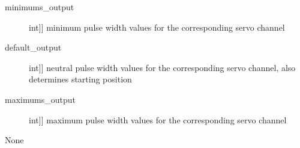\documentclass[letterpaper,10pt,english]{sphinxmanual}
\begin{document}
\begin{fulllineitems}
\begin{fulllineitems}
\sphinxAtStartPar
{}
\begin{description}
\item[{minimums\_output}] \leavevmode{[}{[}int{]}{]}
\sphinxAtStartPar
minimum pulse width values for the corresponding servo channel

\item[{default\_output}] \leavevmode{[}{[}int{]}{]}
\sphinxAtStartPar
neutral pulse width values for the corresponding servo channel, also determines starting position

\item[{maximums\_output}] \leavevmode{[}{[}int{]}{]}
\sphinxAtStartPar
maximum pulse width values for the corresponding servo channel

\end{description}

\sphinxAtStartPar
{}

\sphinxAtStartPar
None

\end{fulllineitems}


\end{fulllineitems}
\end{document}

